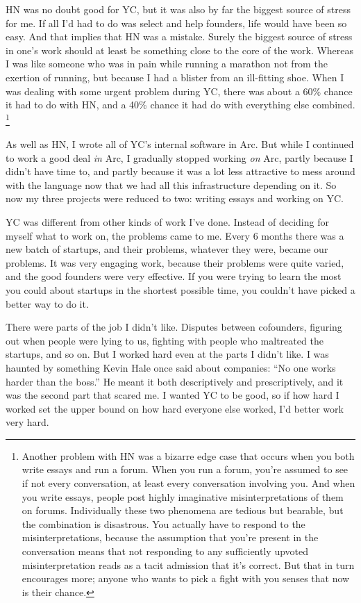 \documentclass[12pt]{book}
\begin{document}
HN was no doubt good for YC, but it was also by far the biggest source
of stress for me. If all I'd had to do was select and help founders,
life would have been so easy. And that implies that HN was a mistake.
Surely the biggest source of stress in one's work should at least be
something close to the core of the work. Whereas I was like someone who
was in pain while running a marathon not from the exertion of running,
but because I had a blister from an ill-fitting shoe. When I was dealing
with some urgent problem during YC, there was about a 60\% chance it had
to do with HN, and a 40\% chance it had do with everything else
combined. \footnote{Another problem with HN was a bizarre edge case that occurs
when you both write essays and run a forum. When you run a forum, you're
assumed to see if not every conversation, at least every conversation
involving you. And when you write essays, people post highly imaginative
misinterpretations of them on forums. Individually these two phenomena
are tedious but bearable, but the combination is disastrous. You
actually have to respond to the misinterpretations, because the
assumption that you're present in the conversation means that not
responding to any sufficiently upvoted misinterpretation reads as a
tacit admission that it's correct. But that in turn encourages more;
anyone who wants to pick a fight with you senses that now is their
chance.}

As well as HN, I wrote all of YC's internal software in Arc. But while I
continued to work a good deal \emph{in} Arc, I gradually stopped working
\emph{on} Arc, partly because I didn't have time to, and partly because
it was a lot less attractive to mess around with the language now that
we had all this infrastructure depending on it. So now my three projects
were reduced to two: writing essays and working on YC.

YC was different from other kinds of work I've done. Instead of deciding
for myself what to work on, the problems came to me. Every 6 months
there was a new batch of startups, and their problems, whatever they
were, became our problems. It was very engaging work, because their
problems were quite varied, and the good founders were very effective.
If you were trying to learn the most you could about startups in the
shortest possible time, you couldn't have picked a better way to do it.

There were parts of the job I didn't like. Disputes between cofounders,
figuring out when people were lying to us, fighting with people who
maltreated the startups, and so on. But I worked hard even at the parts
I didn't like. I was haunted by something Kevin Hale once said about
companies: ``No one works harder than the boss.'' He meant it both
descriptively and prescriptively, and it was the second part that scared
me. I wanted YC to be good, so if how hard I worked set the upper bound
on how hard everyone else worked, I'd better work very hard.
\end{document}
